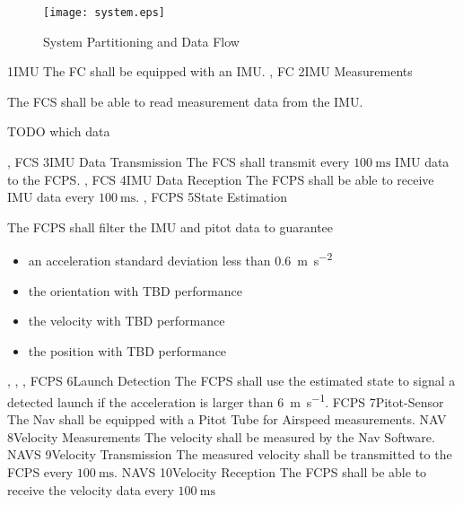 \begin{figure}[h]
    \texttt{[image: system.eps]}
    \caption{System Partitioning and Data Flow}
\end{figure}
\req
    {1}{IMU}
    {
        The FC shall be equipped with an IMU.
    }
    {, }
    {FC}
\req
    {2}{IMU Measurements}
    {
        The FCS shall be able to read measurement data from the IMU.

        TODO which data
    }
    {, }
    {FCS}
\req
    {3}{IMU Data Transmission}
    {
        The FCS shall transmit every $\SI{100}{\milli\second}$ IMU data to the FCPS.
    }
    {, }
    {FCS}
\req
    {4}{IMU Data Reception}
    {
        The FCPS shall be able to receive IMU data every $\SI{100}{\milli\second}$.
    }
    {, }
    {FCPS}
\req
    {5}{State Estimation}
    {
        The FCPS shall filter the IMU and pitot data to guarantee
        \begin{itemize}
            \item an acceleration standard deviation less than \SI{0.6}{\meter \per \second^2}
            \item the orientation with TBD performance
            \item the velocity with TBD performance
            \item the position with TBD performance
        \end{itemize}
    }
    {, , , }
    {FCPS}
\req
    {6}{Launch Detection}
    {
        The FCPS shall use the estimated state to signal a detected
        launch if the acceleration is larger than \SI{6}{\meter \per \second}.
    }
    {}
    {FCPS}
\req
    {7}{Pitot-Sensor}
    {
        The Nav shall be equipped with a Pitot Tube for Airspeed measurements.
    }
    {}
    {NAV}
\req
    {8}{Velocity Measurements}
    {
        The velocity shall be measured by the Nav Software.
    }
    {}
    {NAVS}
\req
    {9}{Velocity Transmission}
    {
        The measured velocity shall be transmitted to the
        FCPS every $\SI{100}{\milli \second}$.
    }
    {}
    {NAVS}
\req
    {10}{Velocity Reception}
    {
        The FCPS shall be able to receive the velocity data
        every $\SI{100}{\milli\second}$
    }
